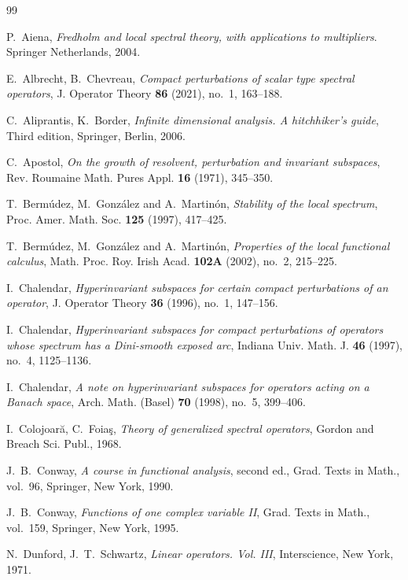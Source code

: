 \documentclass[11pt]{amsart}
\theoremstyle{definition}
\theoremstyle{remark}
\numberwithin{equation}{section}
\begin{document}
\begin{thebibliography}{99}

P.~Aiena, \textit{Fredholm and local spectral theory, with applications to multipliers}. Springer Netherlands, 2004.

E.~Albrecht, B.~Chevreau, \textit{Compact perturbations of scalar type spectral operators}, J. Operator Theory \textbf{86} (2021), no.~1, 163--188.

C.~Aliprantis, K.~Border, \textit{Infinite dimensional analysis. A hitchhiker's guide}, Third edition, Springer, Berlin, 2006.

C.~Apostol, \textit{On the growth of resolvent, perturbation and invariant subspaces}, Rev. Roumaine Math. Pures Appl. \textbf{16} (1971), 345--350.

T.~Berm{\'u}dez, M.~Gonz{\'a}lez and A.~Martin{\'o}n, \textit{Stability of the local spectrum}, Proc. Amer. Math. Soc. \textbf{125} (1997), 417--425.

T.~Berm\'udez, M.~Gonz\'alez and A.~Martin\'on, \textit{Properties of the local functional calculus}, Math. Proc. Roy. Irish Acad. \textbf{102A} (2002), no.~2, 215--225.

I.~Chalendar, \textit{Hyperinvariant subspaces for certain compact perturbations of an operator}, J. Operator Theory \textbf{36} (1996), no.~1, 147--156.

I.~Chalendar, \textit{Hyperinvariant subspaces for compact perturbations of operators whose spectrum has a Dini-smooth exposed arc}, Indiana Univ. Math. J. \textbf{46} (1997), no.~4, 1125--1136.

I.~Chalendar, \textit{A note on hyperinvariant subspaces for operators acting on a Banach space}, Arch. Math. (Basel) \textbf{70} (1998), no.~5, 399--406.

I.~Colojoar\u{a}, C.~Foia\c{s}, \textit{Theory of generalized spectral operators}, Gordon and Breach Sci. Publ., 1968.

J.~B.~Conway, \textit{A course in functional analysis}, second ed., Grad. Texts in Math., vol.~96, Springer, New York, 1990.

J.~B.~Conway, \textit{Functions of one complex variable II}, Grad. Texts in Math., vol.~159, Springer, New York, 1995.

N.~Dunford, J.~T.~Schwartz, \textit{Linear operators. Vol. III}, Interscience, New York, 1971.


\end{thebibliography}
\end{document}
